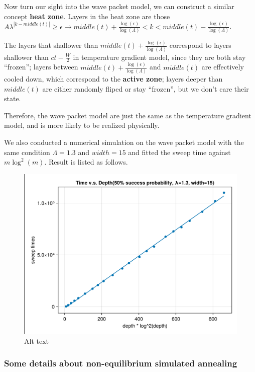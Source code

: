 \documentclass[twocolumn,superscriptaddress,english,showpacs,longbibliography]{revtex4-2}
\begin{document}
Now turn our sight into the wave packet model, we can construct a
similar concept \textbf{heat zone}. Layers in the heat zone are those
$A\lambda^{|k-middle(t)|}\ge \epsilon\rightarrow middle(t) + \frac{\log(\epsilon)}{\log(\Lambda)}< k < middle(t) - \frac{\log(\epsilon)}{\log(\Lambda)}$.

The layers that shallower than
$middle(t) + \frac{\log(\epsilon)}{\log(\Lambda)}$ correspond to
layers shallower than $ct-\frac{W}{2}$ in temperature gradient model,
since they are both stay ``frozen''; layers between
$middle(t) +\frac{\log(\epsilon)}{\log(\Lambda)}$ and $middle(t)$
are effectively cooled down, which correspond to the \textbf{active
zone}; layers deeper than $middle(t)$ are either randomly fliped or
stay ``frozen'', but we don't care their state.

Therefore, the wave packet model are just the same as the temperature
gradient model, and is more likely to be realized physically.

We also conducted a numerical simulation on the wave packet model with
the same condition $\Lambda = 1.3$ and $width = 15$ and fitted the
sweep time against $m\log^2(m)$. Result is listed as follows.

\begin{figure}
\centering
\includegraphics[keepaspectratio]{../notes/images/toy_model_wave_packet_time_vs_depth_1_3.png}
\caption{Alt text}
\end{figure}

\subsubsection{Some details about non-equilibrium simulated
annealing}\label{some-details-about-non-equilibrium-simulated-annealing}
\end{document}
